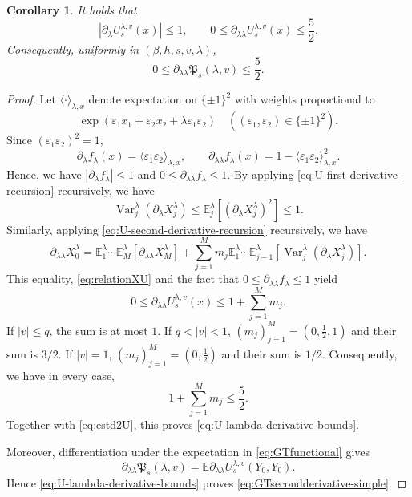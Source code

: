 \documentclass[11pt]{article}
\newtheorem{corollary}[theorem]{Corollary}
\numberwithin{equation}{section}
\newcommand{\E}{\mathbb{E}}
\newcommand{\1}{\mathbf 1}
\begin{document}
\begin{corollary}\label{cor: technical lemma for U and Psi}
It holds that
    \begin{equation}
\left|\partial_\lambda U_s^{\lambda,v}(x)\right|\le1,
\qquad
0\le
\partial_{\lambda\lambda}U_s^{\lambda,v}(x)
\le\frac52.
\label{eq:U-lambda-derivative-bounds}
\end{equation}
Consequently, uniformly in $(\beta,h,s,v,\lambda)$,
\begin{equation}
0\leq \partial_{\lambda\lambda}\mathfrak P_s(\lambda,v)\leq \frac52.
 \label{eq:GTsecondderivative-simple}
\end{equation}
\end{corollary}
\begin{proof}
Let $\langle\cdot\rangle_{\lambda,x}$ denote expectation on
$\{\pm1\}^2$ with weights proportional to
\[
 \exp(\varepsilon_1x_1+\varepsilon_2x_2
             +\lambda\varepsilon_1\varepsilon_2) \quad ( (\varepsilon _1 , \varepsilon _2) \in \{ \pm 1 \} ^2 ).
\]
Since $(\varepsilon_1\varepsilon_2)^2=1$,
\[
 \partial_\lambda f_\lambda(x)
 =\langle\varepsilon_1\varepsilon_2\rangle_{\lambda,x},
 \qquad
 \partial_{\lambda\lambda}f_\lambda(x)
 =1-\langle\varepsilon_1\varepsilon_2\rangle_{\lambda,x}^2.
\]
Hence, we have $|\partial_\lambda f_\lambda|\le1$ and
$0\le\partial_{\lambda\lambda}f_\lambda\le1$.
By applying \eqref{eq:U-first-derivative-recursion} recursively, we have
\[
 \operatorname{Var}_j^\lambda(\partial_\lambda X_j^\lambda)
 \le \E_j^\lambda[(\partial_\lambda X_j^\lambda)^2]
 \le1.
\]
Similarly, applying \eqref{eq:U-second-derivative-recursion} recursively, we have 
\[
\partial_{\lambda\lambda}X_0^\lambda = \E_1^\lambda \cdots \E_M^\lambda
\left[
\partial_{\lambda\lambda}X_M^\lambda
\right]
+
\sum _{j=1}^M m_j
\E_1^\lambda \cdots \E_{j-1}^\lambda \left[ \operatorname{Var}_j^\lambda
\left(
\partial_\lambda X_j^\lambda
\right) \right] .
\]
This equality, \eqref{eq:relationXU} and the fact that $0\le\partial_{\lambda\lambda}f_\lambda\le1$ yield
\begin{equation}\label{eq:estd2U}
 0\le\partial_{\lambda\lambda}U_s^{\lambda,v}(x)
 \le1+\sum_{j=1}^Mm_j.
\end{equation}
If $|v|\le q$, the sum is at most $1$.  If
$q<|v|<1$, $(m_j)_{j=1}^M = ( 0,\frac12,1)$ and their sum is $3/2$.
If $|v|=1$, $(m_j)_{j=1}^M = ( 0,\frac12)$ and their sum is $1/2$.
Consequently, we have in every case,
\[
 1+\sum_{j=1}^Mm_j\le\frac52.
\]
Together with \eqref{eq:estd2U}, this proves
\eqref{eq:U-lambda-derivative-bounds}.

Moreover, differentiation under the expectation in
\eqref{eq:GTfunctional}
gives
\[
 \partial_{\lambda\lambda}\mathfrak P_s(\lambda,v)
 =\E\partial_{\lambda\lambda}
   U_s^{\lambda,v}(Y_0,Y_0).
\]
Hence \eqref{eq:U-lambda-derivative-bounds} proves
\eqref{eq:GTsecondderivative-simple}.
\end{proof}
\end{document}
